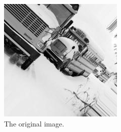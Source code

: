 \documentclass[11pt]{article}
\begin{document}
    \begin{figure}
        \centering
        \begin{subfigure}{0.3\textwidth}
            \centering
            \includegraphics[width=\textwidth]{images/stripes/original.jpg}
            \caption{The original image.}
            \label{subfig:stripes_original}
        \end{subfigure}
        \hfill
        \begin{subfigure}{0.3\textwidth}
            \centering

\end{subfigure}
\end{figure}
\end{document}
